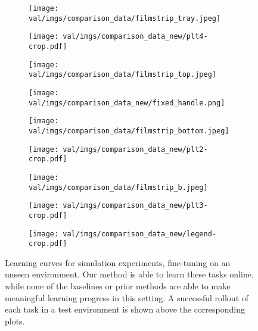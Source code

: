 \begin{figure*}[t]
    \centering
    \begin{subfigure}[b]{0.222\textwidth}
        \center
        \texttt{[image: val/imgs/comparison\_data/filmstrip\_tray.jpeg]}
        
        \vspace{0.1cm}
        \texttt{[image: val/imgs/comparison\_data\_new/plt4-crop.pdf]}
    \end{subfigure}
    \begin{subfigure}[b]{0.21\textwidth}
        \center
        \texttt{[image: val/imgs/comparison\_data/filmstrip\_top.jpeg]}
        
        \vspace{0.1cm}
        \texttt{[image: val/imgs/comparison\_data\_new/fixed\_handle.png]}

    \end{subfigure}
    \begin{subfigure}[b]{0.21\textwidth}
        \center
        \texttt{[image: val/imgs/comparison\_data/filmstrip\_bottom.jpeg]}
        
        \vspace{0.1cm}
        \texttt{[image: val/imgs/comparison\_data\_new/plt2-crop.pdf]}
    \end{subfigure}
    \begin{subfigure}[b]{0.21\textwidth}
        \center
        \texttt{[image: val/imgs/comparison\_data/filmstrip\_b.jpeg]}
        
        \vspace{0.1cm}
        \texttt{[image: val/imgs/comparison\_data\_new/plt3-crop.pdf]}
    \end{subfigure}
    \begin{subfigure}[b]{0.1\textwidth}
        \center
        \texttt{[image: val/imgs/comparison\_data\_new/legend-crop.pdf]}
        \vspace{0.6cm}
    \end{subfigure}
    
    \caption{Learning curves for simulation experiments, fine-tuning on an unseen environment. Our method is able to learn these tasks online, while none of the baselines or prior methods are able to make meaningful learning progress in this setting. A successful rollout of each task in a test environment is shown above the corresponding plots. }
    \label{fig:sim_comparison}
    \vspace{-0.5cm}
\end{figure*}